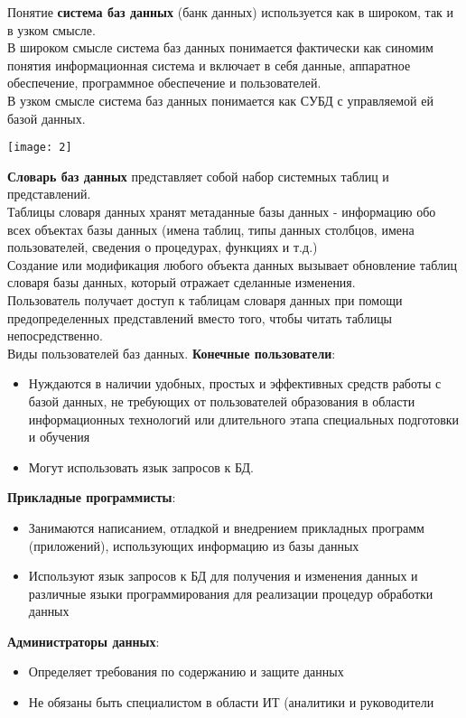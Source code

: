 \documentclass[a4paper]{article}
\begin{document}
Понятие \textbf{система баз данных} (банк данных) используется как в широком, так и в узком смысле.\\
В широком смысле система баз данных понимается фактически как синомим понятия информационная система и включает в себя данные, аппаратное обеспечение, программное обеспечение и пользователей.\\
В узком смысле система баз данных понимается как СУБД с управляемой ей базой данных.
\begin{center}
	\texttt{[image: 2]}
\end{center}
\textbf{Словарь баз данных} представляет собой набор системных таблиц и представлений.\\
Таблицы словаря данных хранят метаданные базы данных - информацию обо всех объектах базы данных (имена таблиц, типы данных столбцов, имена пользователей, сведения о процедурах, функциях и т.д.)\\
Создание или модификация любого объекта данных вызывает обновление таблиц словаря базы данных, который отражает сделанные изменения.\\
Пользователь получает доступ к таблицам словаря данных при помощи предопределенных представлений вместо того, чтобы читать таблицы непосредственно.\\
Виды пользователей баз данных.
\textbf{Конечные пользователи}:
\begin{itemize}
        \item Нуждаются в наличии удобных, простых и эффективных средств работы с базой данных, не требующих от пользователей образования в области информационных технологий или длительного этапа специальных подготовки и обучения
	\item Могут использовать язык запросов к БД.
\end{itemize}
\textbf{Прикладные программисты}:
\begin{itemize}
	\item Занимаются написанием, отладкой и внедрением прикладных программ (приложений), использующих информацию из базы данных
	\item Используют язык запросов к БД для получения и изменения данных и различные языки программирования для реализации процедур обработки данных
\end{itemize}
\textbf{Администраторы данных}:
\begin{itemize}
	\item Определяет требования по содержанию и защите данных
	\item Не обязаны быть специалистом в области ИТ (аналитики и руководители
\end{itemize}
\end{document}
